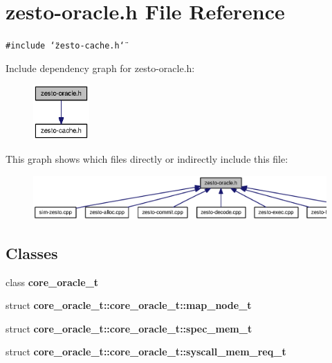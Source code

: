 \section{zesto-oracle.h File Reference}
\label{zesto-oracle_8h}
{\tt \#include \char`\"{}zesto-cache.h\char`\"{}}\par


Include dependency graph for zesto-oracle.h:\nopagebreak
\begin{figure}[H]
\begin{center}
\leavevmode
\includegraphics[width=61pt]{zesto-oracle_8h__incl}
\end{center}
\end{figure}


This graph shows which files directly or indirectly include this file:\nopagebreak
\begin{figure}[H]
\begin{center}
\leavevmode
\includegraphics[width=376pt]{zesto-oracle_8h__dep__incl}
\end{center}
\end{figure}
\subsection*{Classes}
\begin{CompactItemize}
\item 
class {\bf core\_\-oracle\_\-t}
\item 
struct {\bf core\_\-oracle\_\-t::core\_\-oracle\_\-t::map\_\-node\_\-t}
\item 
struct {\bf core\_\-oracle\_\-t::core\_\-oracle\_\-t::spec\_\-mem\_\-t}
\item 
struct {\bf core\_\-oracle\_\-t::core\_\-oracle\_\-t::syscall\_\-mem\_\-req\_\-t}
\end{CompactItemize}
